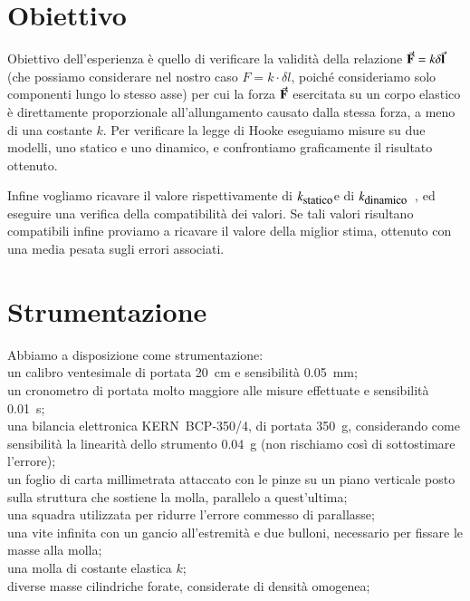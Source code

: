 \documentclass[italian, a4paper, 10pt, twocolumn]{../../style/lab_unige}
\newcommand{\ks}{$k_{\text{\small statico}}$\space}
\newcommand{\kd}{$k_{\text{\small dinamico}}$\space}
\newcommand{\hookeLaw}{$F=k\cdot\delta l$\space}
\begin{document}

    \section{Obiettivo}
    \label{section:aim}
    Obiettivo dell'esperienza è quello di verificare la validità della relazione $\va{F}=k\delta\va{l}$ (che 
    possiamo considerare nel nostro caso \hookeLaw , poiché consideriamo solo componenti lungo lo stesso asse) 
    per cui la forza $\va{F}$ esercitata su un corpo elastico è direttamente proporzionale all'allungamento 
    causato dalla stessa forza, a meno di una costante $k$.
    Per verificare la legge di Hooke eseguiamo misure su due modelli, uno statico e uno dinamico, e confrontiamo 
    graficamente il risultato ottenuto. 
    
    Infine vogliamo ricavare il valore rispettivamente di \ks e di \kd~, ed
    eseguire una verifica della compatibilità dei valori. Se tali valori risultano compatibili infine proviamo a 
    ricavare il valore della miglior stima, ottenuto con una media pesata sugli errori associati.

    \section{Strumentazione}
    \label{section:strument}
    Abbiamo a disposizione come strumentazione:\\
    un calibro ventesimale di portata 20~cm e sensibilità 0.05~mm;\\
    un cronometro di portata molto maggiore alle misure effettuate e sensibilità 0.01~s;\\
    una bilancia elettronica KERN~BCP-350/4, di portata 350~g, considerando come sensibilità la linearità dello 
    strumento 0.04~g (non rischiamo così di sottostimare l'errore);\\
    un foglio di carta millimetrata attaccato con le pinze su un piano verticale posto sulla struttura che sostiene
    la molla, parallelo a quest'ultima;\\
    una squadra utilizzata per ridurre l'errore commesso di parallasse;\\
    una vite infinita con un gancio all'estremità e due bulloni, necessario per fissare le masse alla molla;\\
    una molla di costante elastica $k$;\\
    diverse masse cilindriche forate, considerate di densità omogenea;\\
\end{document}
